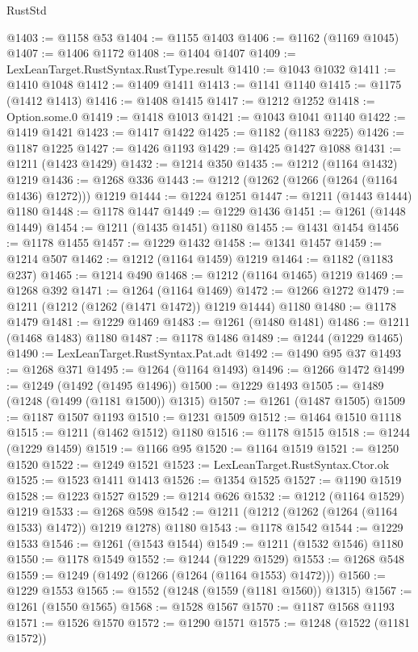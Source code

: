\begin{lexlean}{RustStd}
\begin{coremodule}
@1403 := @1158 @53
@1404 := @1155 @1403
@1406 := @1162 (@1169 @1045)
@1407 := @1406 @1172
@1408 := @1404 @1407
@1409 := LexLeanTarget.RustSyntax.RustType.result
@1410 := @1043 @1032
@1411 := @1410 @1048
@1412 := @1409 @1411
@1413 := @1141 @1140
@1415 := @1175 (@1412 @1413)
@1416 := @1408 @1415
@1417 := @1212 @1252
@1418 := Option.some.{0}
@1419 := @1418 @1013
@1421 := @1043 @1041 @1140
@1422 := @1419 @1421
@1423 := @1417 @1422
@1425 := @1182 (@1183 @225)
@1426 := @1187 @1225
@1427 := @1426 @1193
@1429 := @1425 @1427 @1088
@1431 := @1211 (@1423 @1429)
@1432 := @1214 @350
@1435 := @1212 (@1164 @1432) @1219
@1436 := @1268 @336
@1443 := @1212 (@1262 (@1266 (@1264 (@1164 @1436) @1272))) @1219
@1444 := @1224 @1251
@1447 := @1211 (@1443 @1444) @1180
@1448 := @1178 @1447
@1449 := @1229 @1436
@1451 := @1261 (@1448 @1449)
@1454 := @1211 (@1435 @1451) @1180
@1455 := @1431 @1454
@1456 := @1178 @1455
@1457 := @1229 @1432
@1458 := @1341 @1457
@1459 := @1214 @507
@1462 := @1212 (@1164 @1459) @1219
@1464 := @1182 (@1183 @237)
@1465 := @1214 @490
@1468 := @1212 (@1164 @1465) @1219
@1469 := @1268 @392
@1471 := @1264 (@1164 @1469)
@1472 := @1266 @1272
@1479 := @1211 (@1212 (@1262 (@1471 @1472)) @1219 @1444) @1180
@1480 := @1178 @1479
@1481 := @1229 @1469
@1483 := @1261 (@1480 @1481)
@1486 := @1211 (@1468 @1483) @1180
@1487 := @1178 @1486
@1489 := @1244 (@1229 @1465)
@1490 := LexLeanTarget.RustSyntax.Pat.adt
@1492 := @1490 @95 @37
@1493 := @1268 @371
@1495 := @1264 (@1164 @1493)
@1496 := @1266 @1472
@1499 := @1249 (@1492 (@1495 @1496))
@1500 := @1229 @1493
@1505 := @1489 (@1248 (@1499 (@1181 @1500)) @1315)
@1507 := @1261 (@1487 @1505)
@1509 := @1187 @1507 @1193
@1510 := @1231 @1509
@1512 := @1464 @1510 @1118
@1515 := @1211 (@1462 @1512) @1180
@1516 := @1178 @1515
@1518 := @1244 (@1229 @1459)
@1519 := @1166 @95
@1520 := @1164 @1519
@1521 := @1250 @1520
@1522 := @1249 @1521
@1523 := LexLeanTarget.RustSyntax.Ctor.ok
@1525 := @1523 @1411 @1413
@1526 := @1354 @1525
@1527 := @1190 @1519
@1528 := @1223 @1527
@1529 := @1214 @626
@1532 := @1212 (@1164 @1529) @1219
@1533 := @1268 @598
@1542 := @1211 (@1212 (@1262 (@1264 (@1164 @1533) @1472)) @1219 @1278) @1180
@1543 := @1178 @1542
@1544 := @1229 @1533
@1546 := @1261 (@1543 @1544)
@1549 := @1211 (@1532 @1546) @1180
@1550 := @1178 @1549
@1552 := @1244 (@1229 @1529)
@1553 := @1268 @548
@1559 := @1249 (@1492 (@1266 (@1264 (@1164 @1553) @1472)))
@1560 := @1229 @1553
@1565 := @1552 (@1248 (@1559 (@1181 @1560)) @1315)
@1567 := @1261 (@1550 @1565)
@1568 := @1528 @1567
@1570 := @1187 @1568 @1193
@1571 := @1526 @1570
@1572 := @1290 @1571
@1575 := @1248 (@1522 (@1181 @1572))

\end{coremodule}
\end{lexlean}
